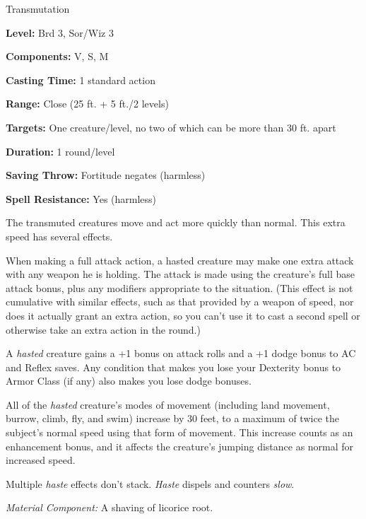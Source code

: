 
Transmutation

\textbf{Level:} Brd 3, Sor/Wiz 3

\textbf{Components:} V, S, M

\textbf{Casting Time:} 1 standard action

\textbf{Range:} Close (25 ft. + 5 ft./2 levels)

\textbf{Targets:} One creature/level, no two of which can be more than 30 ft. apart

\textbf{Duration:} 1 round/level

\textbf{Saving Throw:} Fortitude negates (harmless)

\textbf{Spell Resistance:} Yes (harmless)

The transmuted creatures move and act more quickly than normal. This extra speed 
has several effects.

When making a full attack action, a hasted creature may make one extra attack with 
any weapon he is holding. The attack is made using the creature's full base attack 
bonus, plus any modifiers appropriate to the situation. (This effect is not cumulative 
with similar effects, such as that provided by a weapon of speed, nor does it actually 
grant an extra action, so you can't use it to cast a second spell or otherwise 
take an extra action in the round.)

A \textit{hasted} creature gains a +1 bonus on attack rolls and a +1 dodge bonus 
to AC and Reflex saves. Any condition that makes you lose your Dexterity bonus 
to Armor Class (if any) also makes you lose dodge bonuses.

All of the \textit{hasted} creature's modes of movement (including land movement, 
burrow, climb, fly, and swim) increase by 30 feet, to a maximum of twice the subject's 
normal speed using that form of movement. This increase counts as an enhancement 
bonus, and it affects the creature's jumping distance as normal for increased speed.

Multiple \textit{haste} effects don't stack. \textit{Haste} dispels and counters 
\textit{slow}.

\textit{Material Component:} A shaving of licorice root.

